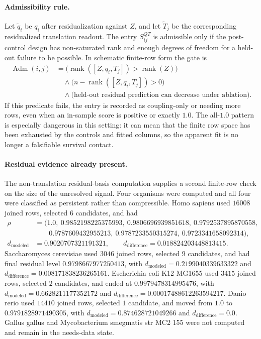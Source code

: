 \paragraph{Admissibility rule.}
Let $\widetilde q_i$ be $q_i$ after residualization against $Z$, and let $\widetilde T_j$ be the corresponding residualized translation readout.  The entry $S^{QT}_{ij}$ is admissible only if the post-control design has non-saturated rank and enough degrees of freedom for a held-out failure to be possible.  In schematic finite-row form the gate is
$$
\begin{aligned}
\operatorname{Adm}(i,j)
  &= \bigl(\operatorname{rank}([Z,q_i,T_j]) > \operatorname{rank}(Z)\bigr)\\
  &\quad {}\wedge \bigl(n - \operatorname{rank}([Z,q_i,T_j]) > 0\bigr)\\
  &\quad {}\wedge \bigl(\text{held-out residual prediction can decrease under ablation}\bigr).
\end{aligned}
$$
If this predicate fails, the entry is recorded as coupling-only or needing more rows, even when an in-sample score is positive or exactly $1.0$.  The all-$1.0$ pattern is especially dangerous in this setting: it can mean that the finite row space has been exhausted by the controls and fitted columns, so the apparent fit is no longer a falsifiable survival contact.

\paragraph{Residual evidence already present.}
The non-translation residual-basis computation supplies a second finite-row check on the size of the unresolved signal.  Four organisms were computed and all four were classified as persistent rather than compressible.  Homo sapiens used $16008$ joined rows, selected $6$ candidates, and had
$$
\begin{aligned}
\rho &= (1.0,\ 0.9852198225375993,\ 0.9806696939851618,\ 0.9792537895870558,\\
&\qquad 0.9787609432955213,\ 0.9787233550315274,\ 0.9723341658092314),\\
d_{\mathrm{modeled}} &= 0.9020707321191321,\qquad d_{\mathrm{difference}} = 0.018824203448813415.
\end{aligned}
$$
Saccharomyces cerevisiae used $3046$ joined rows, selected $9$ candidates, and had final residual level $0.9798667977250413$, with $d_{\mathrm{modeled}}=0.2199040339633322$ and $d_{\mathrm{difference}}=0.008171838236265161$.  Escherichia coli K12 MG1655 used $3415$ joined rows, selected $2$ candidates, and ended at $0.9979478314995476$, with $d_{\mathrm{modeled}}=0.6628211177352172$ and $d_{\mathrm{difference}}=0.00017488612263594217$.  Danio rerio used $14410$ joined rows, selected $1$ candidate, and moved from $1.0$ to $0.9791828971490305$, with $d_{\mathrm{modeled}}=0.874628721049266$ and $d_{\mathrm{difference}}=0.0$.  Gallus gallus and Mycobacterium smegmatis str MC2 155 were not computed and remain in the needs-data state.

